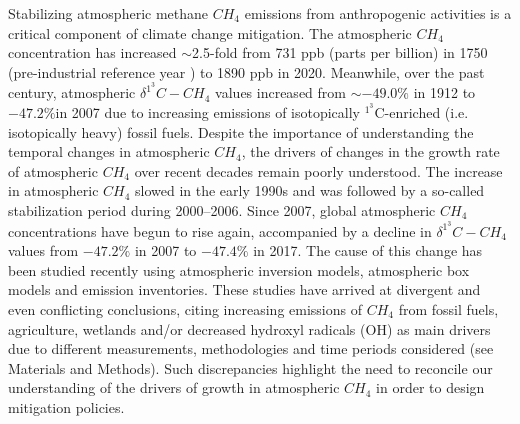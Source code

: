 \documentclass[a4paper,12pt]{article}
\begin{document}
\small{Stabilizing atmospheric methane $CH_{4}$ emissions from anthropogenic activities is a critical component of climate change mitigation. The atmospheric $CH_{4}$ concentration has increased $\sim$2.5-fold from 731 ppb (parts per billion) in 1750 (pre-industrial reference year ) to 1890 ppb in 2020. Meanwhile, over the past century, atmospheric $\delta ^1^3C-CH_{4}$ values increased from $\sim−49.0\%$ in 1912 to $−47.2\%$in 2007 due to increasing emissions of isotopically $^1^3$C-enriched (i.e. isotopically heavy) fossil fuels. Despite the importance of understanding the temporal changes in atmospheric $CH_{4}$, the drivers of changes in the growth rate of atmospheric $CH_{4}$ over recent decades remain poorly understood. The increase in atmospheric $CH_{4}$ slowed in the early 1990s and was followed by a so-called stabilization period during 2000–2006. Since 2007, global atmospheric $CH_{4}$ concentrations have begun to rise again, accompanied by a decline in $\delta ^1^3C-CH_{4}$ values from $−47.2\%$ in 2007 to $−47.4\%$ in 2017. The cause of this change has been studied recently using atmospheric inversion models, atmospheric box models and emission inventories. These studies have arrived at divergent and even conflicting conclusions, citing increasing emissions of $CH_{4}$ from fossil fuels, agriculture, wetlands and/or decreased hydroxyl radicals (OH) as main drivers due to different measurements, methodologies and time periods considered (see Materials and Methods). Such discrepancies highlight the need to reconcile our understanding of the drivers of growth in atmospheric $CH_{4}$ in order to design mitigation policies.}
\\\\
\end{document}
